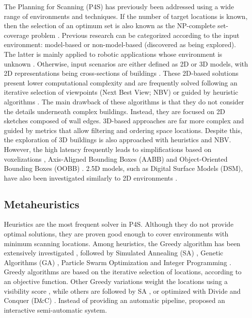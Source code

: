 The Planning for Scanning (P4S) has previously been addressed using a wide range of environments and techniques. If the number of target locations is known, then the selection of an optimum set is also known as the NP-complete set-coverage problem \cite{li_probability_2021, mohamadi_efficient_2021, roostapour_pareto_2022}. Previous research can be categorized according to the input environment: model-based or non-model-based (discovered as being explored). The latter is mainly applied to robotic applications whose environment is unknown \cite{potthast_probabilistic_2014}. Otherwise, input scenarios are either defined as 2D or 3D models, with 2D representations being cross-sections of buildings \cite{giorgini_sensor-based_2019}. These 2D-based solutions present lower computational complexity and are frequently solved following an iterative selection of viewpoints (Next Best View; NBV) or guided by heuristic algorithms \cite{aryan_planning_2021}. The main drawback of these algorithms is that they do not consider the details underneath complex buildings. Instead, they are focused on 2D sketches composed of wall edges. 3D-based approaches are far more complex and guided by metrics that allow filtering and ordering space locations. Despite this, the exploration of 3D buildings is also approached with heuristics and NBV. However, the high latency frequently leads to simplifications based on voxelizations \cite{wakisaka_optimal_2019}, Axis-Aligned Bounding Boxes (AABB) and Object-Oriented Bounding Boxes (OOBB) \cite{li_3d_2022}. 2.5D models, such as Digital Surface Models (DSM), have also been investigated similarly to 2D environments \cite{starek_viewshed_2020}.

\subsection{Metaheuristics}

Heuristics are the most frequent solver in P4S. Although they do not provide optimal solutions, they are proven good enough to cover environments with minimum scanning locations. Among heuristics, the Greedy algorithm has been extensively investigated \cite{zhang_rapid_2016, giorgini_sensor-based_2019, heidari_mozaffar_optimal_2016}, followed by Simulated Annealing (SA) \cite{chen_indoor_2018}, Genetic Algorithms (GA) \cite{jia_comparison_2017}, Particle Swarm Optimization \cite{jia_comparison_2017} and Integer Programming \cite{wakisaka_optimal_2019}. Greedy algorithms are based on the iterative selection of locations, according to an objective function. Other Greedy variations weight the locations using a visibility score \cite{jia_comparison_2017}, while others are followed by SA \cite{latimer_sensor_2004}, or optimized with Divide and Conquer (D\&C) \cite{zhang_rapid_2016}. Instead of providing an automatic pipeline, \cite{ahn_interactive_2016} proposed an interactive semi-automatic system.

